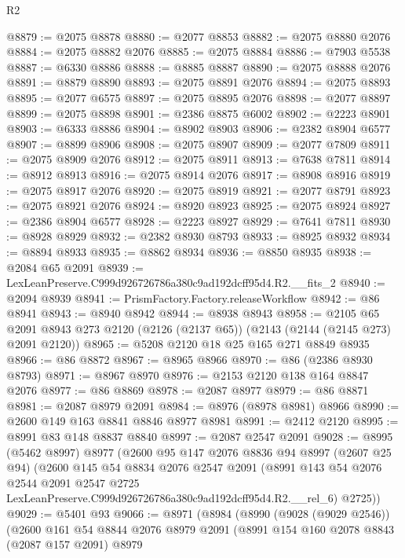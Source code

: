 \begin{lexlean}{R2}
\begin{coremodule}
@8879 := @2075 @8878
@8880 := @2077 @8853
@8882 := @2075 @8880 @2076
@8884 := @2075 @8882 @2076
@8885 := @2075 @8884
@8886 := @7903 @5538
@8887 := @6330 @8886
@8888 := @8885 @8887
@8890 := @2075 @8888 @2076
@8891 := @8879 @8890
@8893 := @2075 @8891 @2076
@8894 := @2075 @8893
@8895 := @2077 @6575
@8897 := @2075 @8895 @2076
@8898 := @2077 @8897
@8899 := @2075 @8898
@8901 := @2386 @8875 @6002
@8902 := @2223 @8901
@8903 := @6333 @8886
@8904 := @8902 @8903
@8906 := @2382 @8904 @6577
@8907 := @8899 @8906
@8908 := @2075 @8907
@8909 := @2077 @7809
@8911 := @2075 @8909 @2076
@8912 := @2075 @8911
@8913 := @7638 @7811
@8914 := @8912 @8913
@8916 := @2075 @8914 @2076
@8917 := @8908 @8916
@8919 := @2075 @8917 @2076
@8920 := @2075 @8919
@8921 := @2077 @8791
@8923 := @2075 @8921 @2076
@8924 := @8920 @8923
@8925 := @2075 @8924
@8927 := @2386 @8904 @6577
@8928 := @2223 @8927
@8929 := @7641 @7811
@8930 := @8928 @8929
@8932 := @2382 @8930 @8793
@8933 := @8925 @8932
@8934 := @8894 @8933
@8935 := @8862 @8934
@8936 := @8850 @8935
@8938 := @2084 @65 @2091
@8939 := LexLeanPreserve.C999d926726786a380c9ad192dcff95d4.R2.__fits_2
@8940 := @2094 @8939
@8941 := PrismFactory.Factory.releaseWorkflow
@8942 := @86 @8941
@8943 := @8940 @8942
@8944 := @8938 @8943
@8958 := @2105
    @65
    @2091
    @8943
    @273
    @2120
    (@2126 (@2137 @65))
    (@2143 (@2144 (@2145 @273) @2091 @2120))
@8965 := @5208 @2120 @18 @25 @165 @271 @8849 @8935
@8966 := @86 @8872
@8967 := @8965 @8966
@8970 := @86 (@2386 @8930 @8793)
@8971 := @8967 @8970
@8976 := @2153 @2120 @138 @164 @8847 @2076
@8977 := @86 @8869
@8978 := @2087 @8977
@8979 := @86 @8871
@8981 := @2087 @8979 @2091
@8984 := @8976 (@8978 @8981) @8966
@8990 := @2600 @149 @163 @8841 @8846 @8977 @8981
@8991 := @2412 @2120
@8995 := @8991 @83 @148 @8837 @8840
@8997 := @2087 @2547 @2091
@9028 := @8995
    (@5462 @8997)
    @8977
    (@2600
      @95
      @147
      @2076
      @8836
      @94
      @8997
      (@2607 @25 @94)
      (@2600
        @145
        @54
        @8834
        @2076
        @2547
        @2091
        (@8991
          @143
          @54
          @2076
          @2544
          @2091
          @2547
          @2725
          LexLeanPreserve.C999d926726786a380c9ad192dcff95d4.R2.__rel_6)
        @2725))
@9029 := @5401 @93
@9066 := @8971
    (@8984
      (@8990
        (@9028 (@9029 @2546))
        (@2600
          @161
          @54
          @8844
          @2076
          @8979
          @2091
          (@8991
            @154
            @160
            @2078
            @8843
            (@2087 @157 @2091)
            @8979

\end{coremodule}
\end{lexlean}
